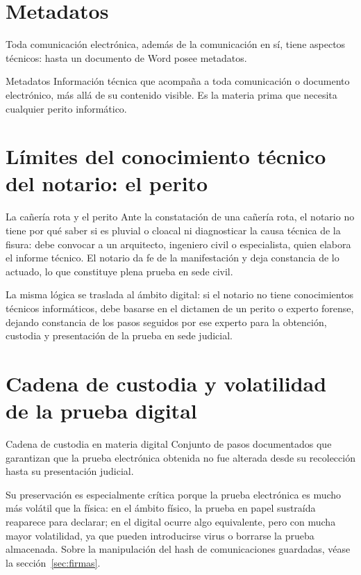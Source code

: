 \documentclass[12pt,oneside]{book}
\begin{document}
\section{Metadatos}

Toda comunicación electrónica, además de la comunicación en sí, tiene aspectos técnicos: hasta un documento de Word posee metadatos.

\begin{definition}{Metadatos}
Información técnica que acompaña a toda comunicación o documento electrónico, más allá de su contenido visible. Es la materia prima que necesita cualquier perito informático.
\end{definition}

\section{Límites del conocimiento técnico del notario: el perito}

\begin{example}{La cañería rota y el perito}
Ante la constatación de una cañería rota, el notario no tiene por qué saber si es pluvial o cloacal ni diagnosticar la causa técnica de la fisura: debe convocar a un arquitecto, ingeniero civil o especialista, quien elabora el informe técnico. El notario da fe de la manifestación y deja constancia de lo actuado, lo que constituye plena prueba en sede civil.

La misma lógica se traslada al ámbito digital: si el notario no tiene conocimientos técnicos informáticos, debe basarse en el dictamen de un perito o experto forense, dejando constancia de los pasos seguidos por ese experto para la obtención, custodia y presentación de la prueba en sede judicial.
\end{example}

\section{Cadena de custodia y volatilidad de la prueba digital}

\begin{definition}{Cadena de custodia en materia digital}
Conjunto de pasos documentados que garantizan que la prueba electrónica obtenida no fue alterada desde su recolección hasta su presentación judicial.
\end{definition}

Su preservación es especialmente crítica porque la prueba electrónica es mucho más volátil que la física: en el ámbito físico, la prueba en papel sustraída reaparece para declarar; en el digital ocurre algo equivalente, pero con mucha mayor volatilidad, ya que pueden introducirse virus o borrarse la prueba almacenada. Sobre la manipulación del hash de comunicaciones guardadas, véase la sección~\ref{sec:firmas}.
\end{document}
